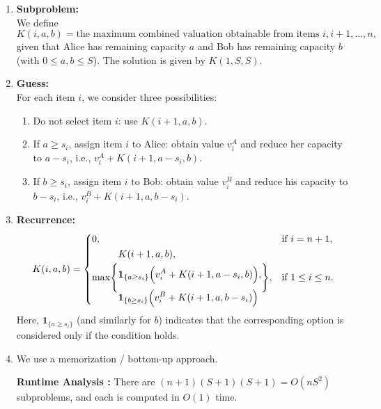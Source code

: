 \documentclass[11pt]{article}
\begin{document}
    \begin{enumerate}
        \item \textbf{Subproblem:}\\
        We define 
        \[
        K(i,a,b) = \text{the maximum combined valuation obtainable from items } i,i+1,\dots,n,
        \]
        given that Alice has remaining capacity \(a\) and Bob has remaining capacity \(b\) (with \(0\le a,b\le S\)). 
        The solution is given by \(K(1,S,S)\).
    
        \item \textbf{Guess:}\\
        For each item \(i\), we consider three possibilities:
        \begin{enumerate}
            \item Do not select item \(i\): use \(K(i+1,a,b)\).
            \item If \(a\ge s_i\), assign item \(i\) to Alice: obtain value \(v_i^A\) and reduce her capacity to \(a-s_i\), i.e., \(v_i^A+K(i+1,a-s_i,b)\).
            \item If \(b\ge s_i\), assign item \(i\) to Bob: obtain value \(v_i^B\) and reduce his capacity to \(b-s_i\), i.e., \(v_i^B+K(i+1,a,b-s_i)\).
        \end{enumerate}
    
        \item \textbf{Recurrence:}\\[1mm]
        \[
        K(i,a,b)=
        \begin{cases}
        0, & \text{if } i = n+1,\\[1mm]
        \max\Biggl\{
        \begin{aligned}
        &K(i+1,a,b),\\[1mm]
        &\mathbf{1}_{\{a\ge s_i\}}\Bigl(v_i^A + K(i+1,a-s_i,b)\Bigr),\\[1mm]
        &\mathbf{1}_{\{b\ge s_i\}}\Bigl(v_i^B + K(i+1,a,b-s_i)\Bigr)
        \end{aligned}
        \Biggr\}, & \text{if } 1\le i\le n.
        \end{cases}
        \]
        Here, \(\mathbf{1}_{\{a\ge s_i\}}\) (and similarly for \(b\)) indicates that the corresponding option is considered only if the condition holds.
    
        \item We use a memorization / bottom-up approach. 
        
            \textbf{Runtime Analysis :}
            There are \((n+1)(S+1)(S+1)=O(nS^2)\) subproblems, and each is computed in \(O(1)\) time. 


\end{enumerate}
\end{document}
